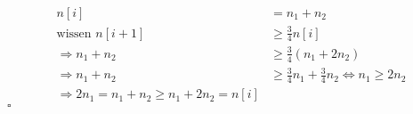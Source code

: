 \begin{description}
\begin{itemize}
\begin{itemize}
\begin{align*}
                    n[i] &= n_1 + n_2 \\
                    \text{wissen } n[i+1] &\geq \frac{3}{4} n[i] \\
                    \Rightarrow n_1 + n_2 &\geq \frac{3}{4} (n_1 + 2 n_2) \\
                    \Rightarrow n_1 + n_2 &\geq \frac{3}{4} n_1 + \frac{3}{4} n_2 \Leftrightarrow n_1 \geq 2n_2 \\
                    \Rightarrow 2n_1 = n_1 + n_2 \geq n_1 + 2 n_2 = n[i]
                   \end{align*}\hfill$\square$

          \end{itemize}

     \end{itemize}
\end{description}
